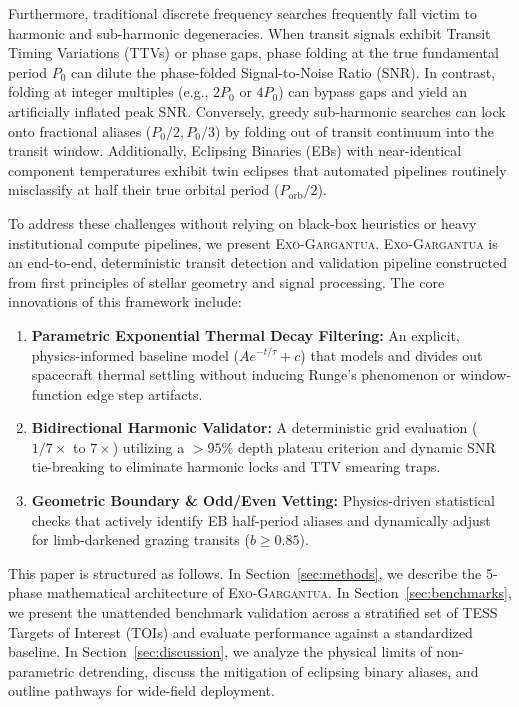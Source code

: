 \documentclass[twocolumn,linenumbers]{aastex701}
\begin{document}
Furthermore, traditional discrete frequency searches frequently fall victim to harmonic and sub-harmonic degeneracies. When transit signals exhibit Transit Timing Variations (TTVs) or phase gaps, phase folding at the true fundamental period $P_0$ can dilute the phase-folded Signal-to-Noise Ratio ($\text{SNR}$). In contrast, folding at integer multiples (e.g., $2P_0$ or $4P_0$) can bypass gaps and yield an artificially inflated peak SNR. Conversely, greedy sub-harmonic searches can lock onto fractional aliases ($P_0/2, P_0/3$) by folding out of transit continuum into the transit window. Additionally, Eclipsing Binaries (EBs) with near-identical component temperatures exhibit twin eclipses that automated pipelines routinely misclassify at half their true orbital period ($P_{\text{orb}}/2$).

To address these challenges without relying on black-box heuristics or heavy institutional compute pipelines, we present \textsc{Exo-Gargantua}. \textsc{Exo-Gargantua} is an end-to-end, deterministic transit detection and validation pipeline constructed from first principles of stellar geometry and signal processing. The core innovations of this framework include:
\begin{enumerate}
    \item \textbf{Parametric Exponential Thermal Decay Filtering:} An explicit, physics-informed baseline model ($A e^{-t/\tau} + c$) that models and divides out spacecraft thermal settling without inducing Runge's phenomenon or window-function edge step artifacts.
    \item \textbf{Bidirectional Harmonic Validator:} A deterministic grid evaluation ($1/7\times$ to $7\times$) utilizing a $>95\%$ depth plateau criterion and dynamic SNR tie-breaking to eliminate harmonic locks and TTV smearing traps.
    \item \textbf{Geometric Boundary \& Odd/Even Vetting:} Physics-driven statistical checks that actively identify EB half-period aliases and dynamically adjust for limb-darkened grazing transits ($b \ge 0.85$).
\end{enumerate}

This paper is structured as follows. In Section~\ref{sec:methods}, we describe the 5-phase mathematical architecture of \textsc{Exo-Gargantua}. In Section~\ref{sec:benchmarks}, we present the unattended benchmark validation across a stratified set of TESS Targets of Interest (TOIs) and evaluate performance against a standardized baseline. In Section~\ref{sec:discussion}, we analyze the physical limits of non-parametric detrending, discuss the mitigation of eclipsing binary aliases, and outline pathways for wide-field deployment.
\end{document}
